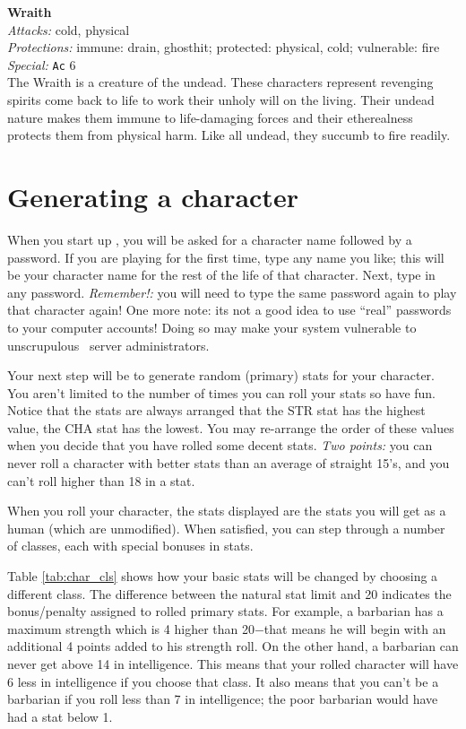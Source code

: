 \noindent{$\bullet$} {\bf Wraith} \\
{\sl Attacks:} cold, physical \\
{\sl Protections:} immune: drain, ghosthit; protected: physical, cold; vulnerable: fire \\
{\sl Special:} {\tt Ac} 6 \\
The Wraith is a creature of the undead. These characters represent revenging spirits come
back to life to work their unholy will on the living. Their undead nature
makes them immune to life-damaging forces and their etherealness protects
them from physical harm. Like all undead, they succumb to fire readily.

\section{Generating a character}\label{sec:char_gen}

When you start up \cf , you will be asked for a character name
followed by a password. If you are playing for the first time, type
any name you like; this will be your character name for the rest of
the life of that character. Next, type in any password.
{\em Remember!:}
you will need to type the same password again to play that character
again! One more note: its not a good idea to use ``real'' passwords
to your computer accounts! Doing so may make your system vulnerable
to unscrupulous \cf\ server administrators.

Your next step will be to generate random (primary) stats for your
character.
You aren't limited to the number of times you can roll your stats\emdash
so have fun.
Notice that the stats are always arranged that the STR stat has
the highest value,
the CHA stat has the lowest. You may re-arrange the order of these values
when you decide that you have rolled some decent stats.
{\em Two points:} you can
never roll a character with better stats than an average of straight 15's,
and you can't roll higher than 18 in a stat.

When you roll your character, the stats displayed are the stats you
will get as a human (which are unmodified).
When satisfied, you can step through a number
of classes, each with special bonuses in stats.

Table \ref{tab:char_cls} shows how your basic stats will
be changed by choosing a different class.
The difference between the natural stat limit and 20 indicates the
bonus/penalty assigned to rolled primary stats. For example, a
barbarian has a maximum strength which is 4 higher than 20$-$that
means he will begin with an additional 4 points added to his
strength roll. On the other hand, a barbarian can never get above 14
in intelligence.  This means that your rolled character will have 6
less in intelligence if you choose that class.  It also means that you
can't be a barbarian if you roll less than 7 in intelligence; the
poor barbarian would have had a stat below 1.

